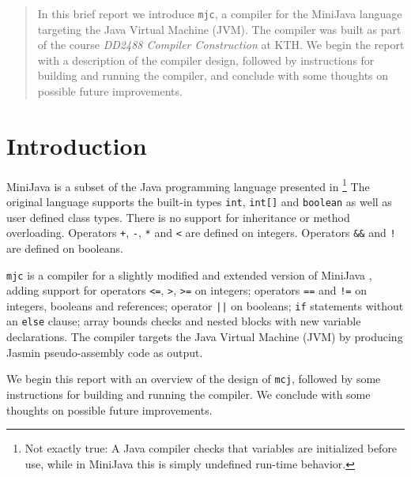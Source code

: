 \documentclass[a4paper,11pt]{article}
\date{XX May 2014}
\author{Daniel Månsson\\dmans@kth.se \and Elvis Stansvik\\stansvik@kth.se}
\begin{document}
\maketitle

\begin{abstract}
\noindent In this brief report we introduce \texttt{mjc}, a compiler for the MiniJava
language targeting the Java Virtual Machine (JVM). The compiler was built as part of
the course \emph{DD2488 Compiler Construction} at KTH. We begin the report with a description
of the compiler design, followed by instructions for building and running the compiler,
and conclude with some thoughts on possible future improvements.
\end{abstract}

\tableofcontents

\thispagestyle{empty}

\newpage

\section{Introduction}

MiniJava is a subset of the Java programming language presented in \cite{appel}
\footnote{Not exactly true: A Java compiler checks that variables are initialized before
use, while in MiniJava this is simply undefined run-time behavior.} The original language
supports the built-in types \texttt{int}, \texttt{int[]} and \texttt{boolean} as well as
user defined class types. There is no support for inheritance or method overloading.
Operators \texttt{+}, \texttt{-}, \texttt{*} and \texttt{<} are defined on integers.
Operators \texttt{\&\&} and \texttt{!} are defined on booleans.

\texttt{mjc} is a compiler for a slightly modified and extended version of MiniJava
\cite{grammar}, adding support for operators \texttt{<=}, \texttt{>}, \texttt{>=}
on integers; operators \texttt{==} and \texttt{!=} on integers, booleans and
references; operator \texttt{||} on booleans; \texttt{if} statements
without an \texttt{else} clause; array bounds checks and nested blocks with new variable
declarations. The compiler targets the Java Virtual Machine (JVM) by producing
Jasmin \cite{jasmin} pseudo-assembly code as output.

We begin this report with an overview of the design of \texttt{mcj}, followed by some
instructions for building and running the compiler. We conclude with some thoughts on
possible future improvements.
\end{document}
